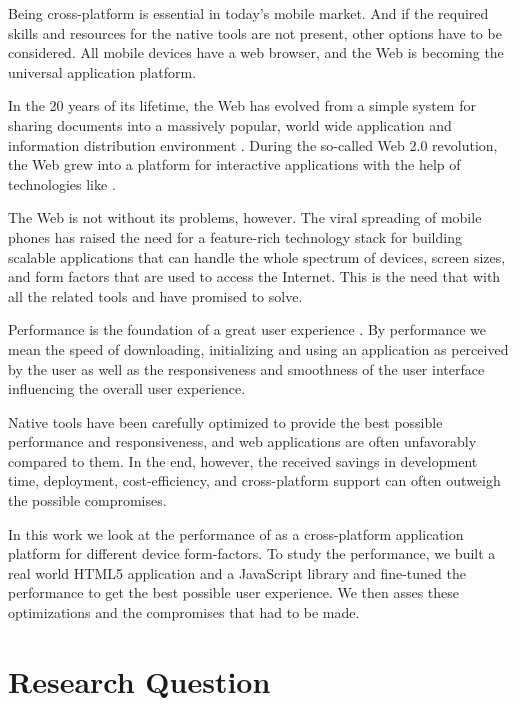 
Being cross-platform is essential in today's mobile market. And if the
required skills and resources for the native tools are not present,
other options have to be considered. All mobile devices have a web
browser, and the Web is becoming the universal application
platform. \cite{taivalsaari2011web, mikkonen2011apps}

In the 20 years of its lifetime, the Web has evolved from a simple
system for sharing documents into a massively popular, world wide
application and information distribution environment
\cite{taivalsaari2011web}. During the so-called Web 2.0 revolution,
the Web grew into a platform for interactive applications with the
help of technologies like  \cite{garrett2005ajax}.

The Web is not without its problems, however. The viral spreading of
mobile phones has raised the need for a feature-rich technology stack
for building scalable applications that can handle the whole spectrum
of devices, screen sizes, and form factors that are used to access the
Internet. This is the need that  with all the related
tools and  have promised to solve.

Performance is the foundation of a great user experience
\cite{charland2011mobile}. By performance we mean the speed of
downloading, initializing and using an application as perceived by the
user as well as the responsiveness and smoothness of the user
interface influencing the overall user experience.

Native tools have been carefully optimized to provide the best
possible performance and responsiveness, and web applications are
often unfavorably compared to them. In the end, however, the received
savings in development time, deployment, cost-efficiency, and
cross-platform support can often outweigh the possible
compromises. \cite{charland2011mobile, fling2009mobile}

In this work we look at the performance of  as a
cross-platform application platform for different device
form-factors. To study the performance, we built a real world HTML5
application and a JavaScript library and fine-tuned the performance to
get the best possible user experience. We then asses these
optimizations and the compromises that had to be made.


\section{Research Question}

